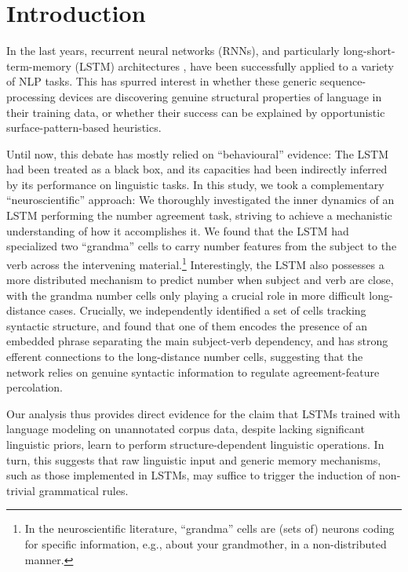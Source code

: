 \section{Introduction}

In the last years, recurrent neural networks (RNNs), and particularly
long-short-term-memory (LSTM) architectures
\cite{Hochreiter:Schmidhuber:1997}, have been successfully applied to
a variety of NLP tasks. This has spurred interest in whether these
generic sequence-processing devices are discovering genuine structural
properties of language in their training data, or whether their
success can be explained by opportunistic surface-pattern-based
heuristics.

Until now, this debate has mostly relied on ``behavioural'' evidence:
The LSTM had been treated as a black box, and its capacities had been indirectly
inferred by its performance on linguistic tasks. In this study, we took a
complementary ``neuroscientific'' approach: We thoroughly investigated
the inner dynamics of an LSTM performing the number agreement task,
striving to achieve a mechanistic understanding of how it accomplishes
it. We found that the LSTM had specialized two ``grandma'' cells
\cite{Bowers:2009} to carry number features from the subject to the
verb across the intervening material.\footnote{In the neuroscientific
  literature, ``grandma'' cells are (sets of) neurons coding for
  specific information, e.g., about your grandmother, in a
  non-distributed manner.} Interestingly, the LSTM also
possesses a more distributed mechanism to predict number when subject
and verb are close, with the grandma number cells only playing a
crucial role in more difficult long-distance cases. Crucially, we
independently identified a set of cells tracking syntactic structure,
and found that one of them encodes the presence of an embedded phrase
separating the main subject-verb dependency, and has strong efferent
connections to the long-distance number cells, suggesting that the
network relies on genuine syntactic information to regulate
agreement-feature percolation.

Our analysis thus provides direct evidence for the claim that LSTMs
trained with language modeling on unannotated corpus data, despite
lacking significant linguistic priors, learn to perform
structure-dependent linguistic operations. In turn, this suggests that
raw linguistic input and generic memory mechanisms, such as those
implemented in LSTMs, may suffice to trigger the induction of
non-trivial grammatical rules.